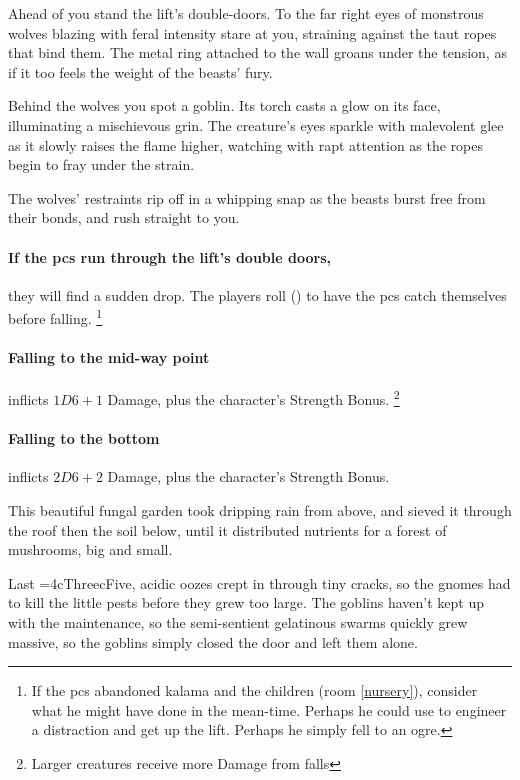 \begin{boxtext}
  Ahead of you stand the lift's double-doors.
  To the far right eyes of monstrous wolves blazing with feral intensity stare at you, straining against the taut ropes that bind them.
  The metal ring attached to the wall groans under the tension, as if it too feels the weight of the beasts' fury.

  Behind the wolves you spot a goblin.
  Its torch casts a glow on its face, illuminating a mischievous grin.
  The creature's eyes sparkle with malevolent glee as it slowly raises the flame higher, watching with rapt attention as the ropes begin to fray under the strain.

  The wolves' restraints rip off in a whipping snap as the beasts burst free from their bonds, and rush straight to you.
\end{boxtext}

\paragraph{If the \glspl{pc} run through the lift's double doors,}
they will find a sudden drop.
The players roll  (\tn[7]) to have the \glspl{pc} catch themselves before falling.%
\footnote{If the \glspl{pc} abandoned \gls{kalama} and the children (room \vref{nursery}), consider what he might have done in the mean-time.
Perhaps he could use  to engineer a distraction and get up the lift.
Perhaps he simply fell to an ogre.}

\paragraph{Falling to the mid-way point}
inflicts $1D6+1$ Damage, plus the character's Strength Bonus.%
\footnote{Larger creatures receive more Damage from falls}

\paragraph{Falling to the bottom}
inflicts $2D6+2$ Damage, plus the character's Strength Bonus.%



\begin{exampletext}
  This beautiful fungal garden took dripping rain from above, and sieved it through the roof then the soil below, until it distributed nutrients for a forest of mushrooms, big and small.

  Last \ifnum\value{cycle}=4\gls{cThree}\else\gls{cFive}\fi, acidic oozes crept in through tiny cracks, so the gnomes had to kill the little pests before they grew too large.
  The goblins haven't kept up with the maintenance, so the semi-sentient gelatinous \glspl{swarm} quickly grew massive, so the goblins simply closed the door and left them alone.
\end{exampletext}


